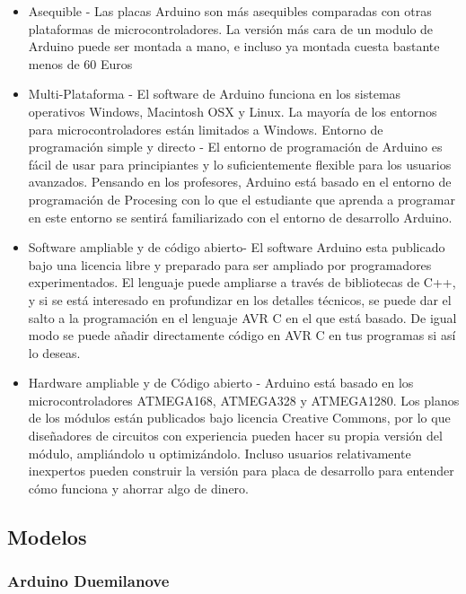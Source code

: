 \documentclass[12pt,a4papert,woside,openright,titlepage,final]{book}
\begin{document}
\begin{itemize} 
    \item Asequible - Las placas Arduino son más asequibles comparadas con
    otras plataformas de microcontroladores. La versión más cara de un modulo
    de Arduino puede ser montada a mano, e incluso ya montada cuesta bastante
    menos de 60 Euros
    
    \item Multi-Plataforma - El software de Arduino funciona en los sistemas
    operativos Windows, Macintosh OSX y Linux. La mayoría de los entornos para
    microcontroladores están limitados a Windows.
    Entorno de programación simple y directo - El entorno de programación de Arduino
    es fácil de usar para principiantes y lo suficientemente flexible para los
    usuarios avanzados. Pensando en los profesores, Arduino está basado en el
    entorno de programación de Procesing con lo que el estudiante que aprenda a
    programar en este entorno se sentirá familiarizado con el entorno de desarrollo
    Arduino.

    \item Software ampliable y de código abierto- El software Arduino esta
    publicado bajo una licencia libre y preparado para ser ampliado por
    programadores experimentados. El lenguaje puede ampliarse a través de
    bibliotecas de C++, y si se está interesado en profundizar en los detalles
    técnicos, se puede dar el salto a la programación en el lenguaje AVR C en el
    que está basado. De igual modo se puede añadir directamente código en AVR C
    en tus programas si así lo deseas.
	
    \item Hardware ampliable y de Código abierto - Arduino está basado en los
    microcontroladores ATMEGA168, ATMEGA328 y ATMEGA1280. Los planos de los
    módulos están publicados bajo licencia Creative Commons, por lo que
    diseñadores de circuitos con experiencia pueden hacer su propia versión del
    módulo, ampliándolo u optimizándolo. Incluso usuarios relativamente
    inexpertos pueden construir la versión para placa de desarrollo para
    entender cómo funciona y ahorrar algo de dinero.
\end{itemize}


\subsection{Modelos}

\subsubsection{Arduino Duemilanove}
\end{document}
